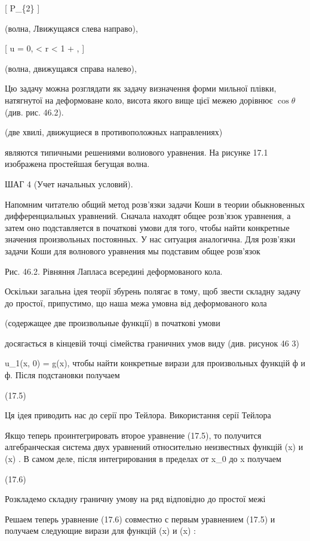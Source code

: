 \documentclass[
  ukrainian,
]{article}
\begin{document}
{[} P\_\{2\} {]}

(волна, Лвижущаяся слева направо),

{[} \Delta u = 0,  \textless{} r \textless{} 1 + 
\sin \theta, {]}

(волна, движущаяся справа налево),

Цю задачу можна розглядати як задачу визначення форми мильної плівки,
натягнутої на деформоване коло, висота якого вище цієї межею дорівнює
\(\cos\theta\) (див. рис. 46.2).

(две хвилі, движущиеся в противоположных направлениях)

являются типичными решениями волиового уравнения. На рисунке 17.1
изображена простейшая бегущая волна.

ШАГ 4 (Учет начальных условий).

Напомним читателю общий метод розв'язки задачи Коши в теории
обыкновенных дифференциальных уравнений. Сначала находят общее розв'язок
уравнения, а затем оно подставляется в початкові умови для того, чтобы
найти конкретные значения произвольных постоянных. У нас ситуация
аналогична. Для розв'язки задачи Коши для волнового уравнения мы
подставим общее розв'язок

Рис. 46.2. Рівняння Лапласа всередині деформованого кола.

Оскільки загальна ідея теорії збурень полягає в тому, щоб звести складну
задачу до простої, припустимо, що наша межа умовна від деформованого
кола

(содержащее две произвольные функції) в початкові умови

досягається в кінцевій точці сімейства граничних умов виду (див. рисунок
46 3)

u\_1(x, 0) = g(x), чтобы найти конкретные вирази для произвольных
функцій ф и ф. Після подстановки получаем

(17.5)

Ця ідея приводить нас до серії про Тейлора. Використання серії Тейлора

Якщо теперь проинтегрировать второе уравнение (17.5), то получится
алгебранческая система двух уравнений относительно неизвестных функцій
\varphi(x) и \psi(x) . В самом деле, після интегрирования в пределах от
x\_0 до x получаем

(17.6)

Розкладемо складну граничну умову на ряд відповідно до простої межі

Решаем теперь уравнение (17.6) совместно с первым уравнением (17.5) и
получаем следующие вирази для функцій \varphi(x) и \psi(x) :
\end{document}
